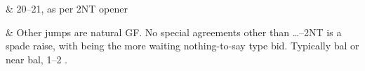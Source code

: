 \documentclass[tom-ari]{subfile}
\begin{document}
	\begin{bidtable}{}
		& 20--21, as per 2NT opener
	\end{bidtable}

	\begin{bidtable}{}
		& Other jumps are natural GF.  No special agreements other than \ldots{}--2NT is a spade raise, with  being the more waiting nothing-to-say type bid. Typically bal or near bal, 1--2 \spadesuit.
	\end{bidtable}
\end{document}
